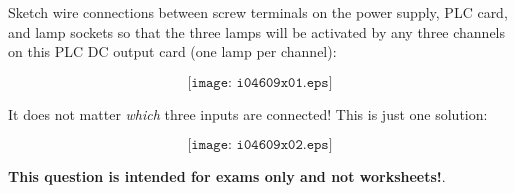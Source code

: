 

Sketch wire connections between screw terminals on the power supply, PLC card, and lamp sockets so that the three lamps will be activated by any three channels on this PLC DC output card (one lamp per channel):

$$\texttt{[image: i04609x01.eps]}$$







It does not matter {\it which} three inputs are connected!  This is just one solution:

$$\texttt{[image: i04609x02.eps]}$$







{\bf This question is intended for exams only and not worksheets!}.


